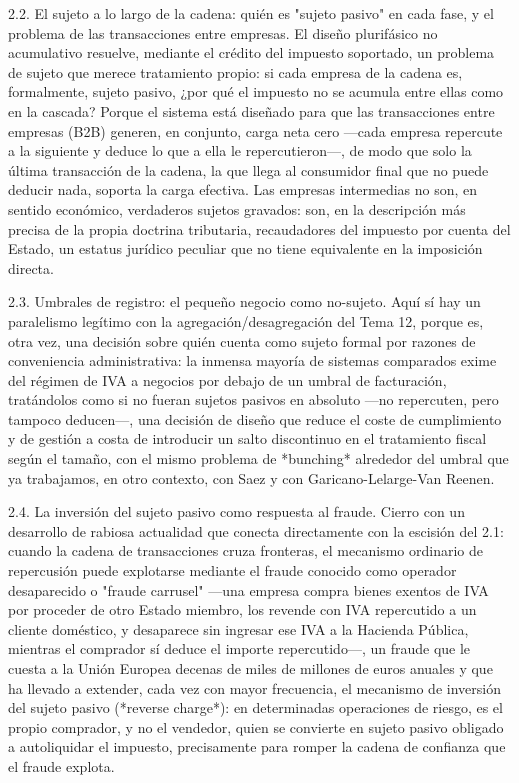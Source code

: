 \documentclass[10pt,a4paper]{article}
\begin{document}
2.2. El sujeto a lo largo de la cadena: quién es "sujeto pasivo" en cada fase, y el problema de las transacciones entre empresas. El diseño plurifásico no acumulativo resuelve, mediante el crédito del impuesto soportado, un problema de sujeto que merece tratamiento propio: si cada empresa de la cadena es, formalmente, sujeto pasivo, ¿por qué el impuesto no se acumula entre ellas como en la cascada? Porque el sistema está diseñado para que las transacciones entre empresas (B2B) generen, en conjunto, carga neta cero —cada empresa repercute a la siguiente y deduce lo que a ella le repercutieron—, de modo que solo la última transacción de la cadena, la que llega al consumidor final que no puede deducir nada, soporta la carga efectiva. Las empresas intermedias no son, en sentido económico, verdaderos sujetos gravados: son, en la descripción más precisa de la propia doctrina tributaria, recaudadores del impuesto por cuenta del Estado, un estatus jurídico peculiar que no tiene equivalente en la imposición directa.

2.3. Umbrales de registro: el pequeño negocio como no-sujeto. Aquí sí hay un paralelismo legítimo con la agregación/desagregación del Tema 12, porque es, otra vez, una decisión sobre quién cuenta como sujeto formal por razones de conveniencia administrativa: la inmensa mayoría de sistemas comparados exime del régimen de IVA a negocios por debajo de un umbral de facturación, tratándolos como si no fueran sujetos pasivos en absoluto —no repercuten, pero tampoco deducen—, una decisión de diseño que reduce el coste de cumplimiento y de gestión a costa de introducir un salto discontinuo en el tratamiento fiscal según el tamaño, con el mismo problema de *bunching* alrededor del umbral que ya trabajamos, en otro contexto, con Saez y con Garicano-Lelarge-Van Reenen.

2.4. La inversión del sujeto pasivo como respuesta al fraude. Cierro con un desarrollo de rabiosa actualidad que conecta directamente con la escisión del 2.1: cuando la cadena de transacciones cruza fronteras, el mecanismo ordinario de repercusión puede explotarse mediante el fraude conocido como operador desaparecido o "fraude carrusel" —una empresa compra bienes exentos de IVA por proceder de otro Estado miembro, los revende con IVA repercutido a un cliente doméstico, y desaparece sin ingresar ese IVA a la Hacienda Pública, mientras el comprador sí deduce el importe repercutido—, un fraude que le cuesta a la Unión Europea decenas de miles de millones de euros anuales y que ha llevado a extender, cada vez con mayor frecuencia, el mecanismo de inversión del sujeto pasivo (*reverse charge*): en determinadas operaciones de riesgo, es el propio comprador, y no el vendedor, quien se convierte en sujeto pasivo obligado a autoliquidar el impuesto, precisamente para romper la cadena de confianza que el fraude explota.
\end{document}
